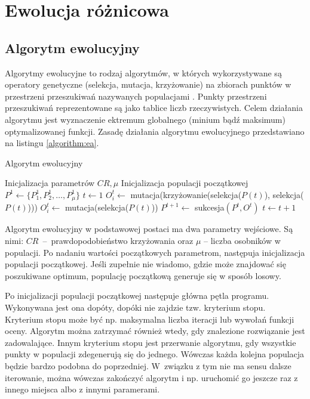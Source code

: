 \documentclass[a4paper,onecolumn,oneside,12pt,wide,floatssmall]{mwrep}
\theoremstyle{definition}
\theoremstyle{plain}%
\theoremstyle{remark}
\begin{document}
\chapter{Ewolucja różnicowa}

\section{Algorytm ewolucyjny}

Algorytmy ewolucyjne to rodzaj algorytmów, w których wykorzystywane są operatory genetyczne (selekcja,
mutacja, krzyżowanie) na zbiorach punktów w przestrzeni przeszukiwań nazywanych populacjami \cite{jarabas}. 
Punkty przestrzeni przeszukiwań
reprezentowane są jako tablice liczb rzeczywistych. 
Celem działania algorytmu jest
wyznaczenie ektremum globalnego (minium bądź maksimum) optymalizowanej funkcji.
Zasadę działania algorytmu ewolucyjnego przedstawiano na listingu \ref{algorithm:ea}.

\begin{algorithm}[H]
\caption{Algorytm ewolucyjny}
\label{algorithm:ea}
\begin{algorithmic}[1]
\State Inicjalizacja parametrów $CR, \mu$
\State Inicjalizacja populacji początkowej $P^1 \gets \{P^1_1, P^1_2, \ldots, P^1_{\mu}\}$
\State $t \gets 1$
      \State $O^t_i \gets$ mutacja(krzy{\.z}owanie(selekcja($P(t)$), selekcja($P(t)$)))
    \Else
      \State $O^t_i \gets$ mutacja(selekcja($P(t)$))
    \EndIf
  \EndFor
  \State $P^{t+1} \gets$ sukcesja$(P^t, O^t)$
  \State $t \gets t+1$
\EndWhile
\end{algorithmic}
\end{algorithm}

Algorytm ewolucyjny w podstawowej postaci ma dwa parametry wejściowe.
Są nimi: $CR$~--~prawdopodobieństwo krzyżowania oraz $\mu$ -- liczba osobników w populacji.
Po nadaniu wartości początkowych parametrom, następuja inicjalizacja populacji początkowej. 
Jeśli zupełnie nie wiadomo, gdzie może znajdować się poszukiwane optimum, 
populację początkową generuje się w sposób losowy. 

Po inicjalizacji populacji początkowej następuje główna pętla programu. 
Wykonywana jest ona dopóty, dopóki nie zajdzie tzw. kryterium stopu. 
Kryterium stopu może być np. maksymalna liczba iteracji lub wywołań funkcji oceny.
Algorytm można zatrzymać również wtedy, gdy znalezione rozwiązanie jest zadowalające. 
Innym kryterium stopu jest przerwanie algorytmu, gdy wszystkie 
punkty w populacji zdegenerują się do jednego. Wówczas
każda kolejna populacja będzie bardzo podobna do poprzedniej. 
W związku z tym nie ma sensu dalsze iterowanie, 
można wówczas zakończyć algorytm i np. uruchomić go jeszcze raz z innego miejsca
albo z innymi paramerami.
\end{document}
